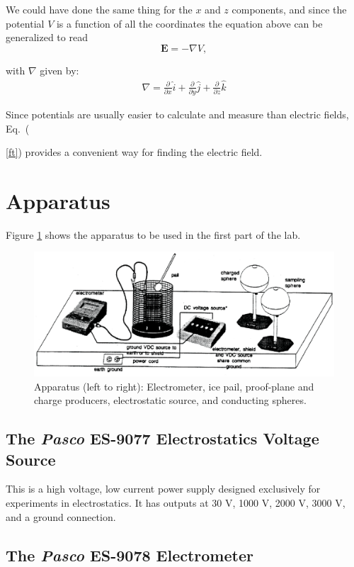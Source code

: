 {We could have done the same thing for the $x$ and $z$ components,
and since the potential $V$ is a function of all the coordinates
the equation above can be generalized to read
\begin{equation}
{\mathbf{E}}=-\nabla V,
 \label{ft}
\end{equation}

with $\nabla$ given by:
\begin{eqnarray*}
\nabla=\frac{\partial}{\partial x}\hat{i}+\frac{\partial}{\partial
y}\hat{j}+\frac{\partial}{\partial z}\hat{k}
\end{eqnarray*}

Since potentials are usually easier to calculate and measure than
electric fields, Eq.~({\ref{ft}) provides a convenient way for
finding the electric field.



\section{Apparatus}
Figure \ref{es5} shows the apparatus to be used in the first part
of the lab.

\begin{figure}[!htb]
\centering
\epsfxsize=16cm \includegraphics[scale=0.8]{1_electrostatics/Electrostatics.eps}
\caption{Apparatus (left to right): Electrometer, ice
pail, proof-plane and charge producers, electrostatic source, and
conducting spheres.}
 \label{es5}
\end{figure}

\subsection{The {\it Pasco} ES-9077 Electrostatics Voltage Source}
This is a high voltage, low current power supply designed
exclusively for experiments in electrostatics.  It has outputs at
30 V, 1000 V, 2000 V, 3000 V, and a ground connection.


\subsection{The {\it Pasco} ES-9078 Electrometer}

}}
